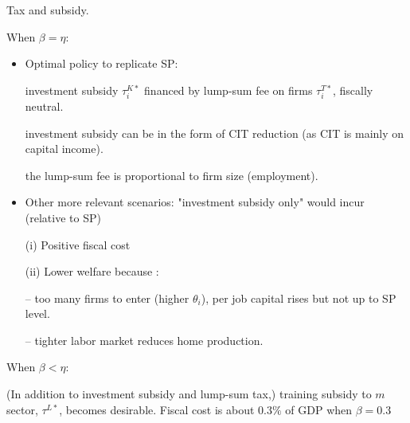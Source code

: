 \documentclass[9pt,xcolor={svgnames}]{beamer}
\begin{document}
\begin{frame}{Tax and subsidy.}


When $\beta=\eta$:


\begin{itemize}
    

\item Optimal policy to replicate SP: 

investment subsidy $\tau^{K*}_i$ financed by lump-sum fee on firms $\tau^{T*}_i$,  fiscally neutral.

investment subsidy can be in the form of CIT reduction (as CIT is mainly on capital income). 

the lump-sum fee is proportional to firm size (employment).

\vspace{3mm}

\item Other more relevant scenarios: "investment subsidy only" would incur (relative to SP)

(i)  Positive fiscal cost

(ii) Lower welfare because :

-- too many firms to enter (higher $\theta_i$), per job capital rises but not up to SP level. 

-- tighter labor market reduces home production. 


\end{itemize}


\vspace{3mm}

When $\beta<\eta$: 

(In addition to investment subsidy and lump-sum tax,) 
training subsidy to $m$ sector, $\tau^{L*}$, becomes desirable. Fiscal cost is about $0.3\%$ of GDP when $\beta=0.3$


    
\end{frame}
\end{document}
